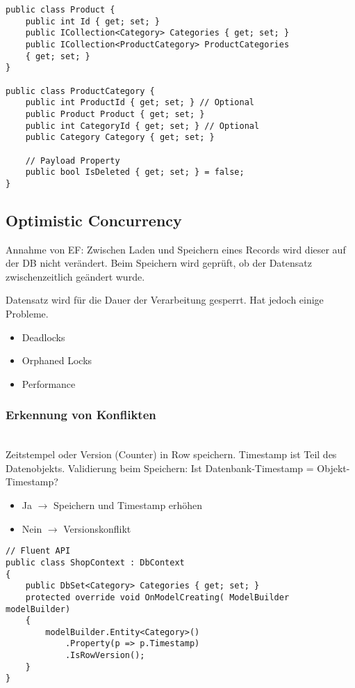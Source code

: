 \begin{multicols*}{2}
\begin{lstlisting}
public class Product {
    public int Id { get; set; }
    public ICollection<Category> Categories { get; set; } 
    public ICollection<ProductCategory> ProductCategories
    { get; set; }
}

public class ProductCategory {
    public int ProductId { get; set; } // Optional 
    public Product Product { get; set; }
    public int CategoryId { get; set; } // Optional 
    public Category Category { get; set; }
    
    // Payload Property
    public bool IsDeleted { get; set; } = false; 
}
\end{lstlisting}

\subsection{Optimistic Concurrency}
Annahme von EF: Zwischen Laden und Speichern eines Records wird dieser auf der DB nicht verändert.
Beim Speichern wird geprüft, ob der Datensatz zwischenzeitlich geändert wurde.

 Datensatz wird für die Dauer der Verarbeitung gesperrt. Hat jedoch einige Probleme.
\begin{itemize}
    \item Deadlocks
    \item Orphaned Locks
    \item Performance
\end{itemize}
\subsubsection{Erkennung von Konflikten}
\\
Zeitstempel oder Version (Counter) in Row speichern. Timestamp ist Teil des Datenobjekts.
Validierung beim Speichern: Ist Datenbank-Timestamp = Objekt-Timestamp?
\begin{itemize}
    \item Ja $\rightarrow$ Speichern und Timestamp erhöhen
    \item Nein $\rightarrow$ Versionskonflikt
\end{itemize}
\begin{lstlisting}
// Fluent API
public class ShopContext : DbContext
{
    public DbSet<Category> Categories { get; set; }
    protected override void OnModelCreating( ModelBuilder modelBuilder)
    { 
        modelBuilder.Entity<Category>()
            .Property(p => p.Timestamp)
            .IsRowVersion();
    }
}


\end{lstlisting}
\end{multicols*}
